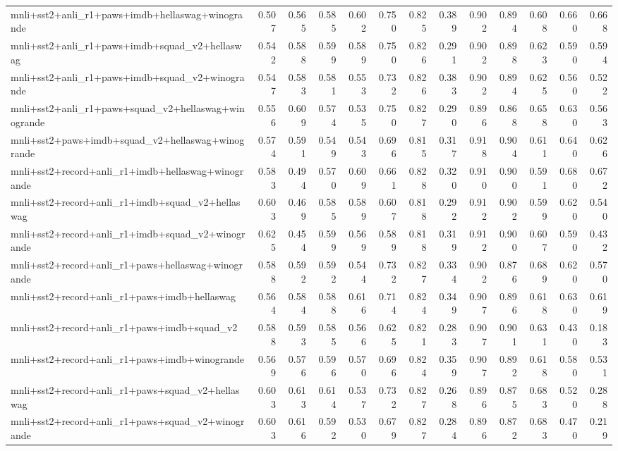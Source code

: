 \begin{table}[t]
\begin{tabular}{lrrrrrrrrrrrr}
    mnli+sst2+anli\_r1+paws+imdb+hellaswag+winogrande & 0.507 & 0.565 & 0.585 & 0.602 & 0.750 & 0.825 & 0.389 & 0.902 & 0.894 & 0.608 & 0.660 & 0.668 \\
    mnli+sst2+anli\_r1+paws+imdb+squad\_v2+hellaswag & 0.542 & 0.588 & 0.599 & 0.589 & 0.750 & 0.826 & 0.291 & 0.902 & 0.898 & 0.623 & 0.590 & 0.594 \\
    mnli+sst2+anli\_r1+paws+imdb+squad\_v2+winogrande & 0.547 & 0.583 & 0.581 & 0.553 & 0.732 & 0.826 & 0.383 & 0.902 & 0.894 & 0.625 & 0.560 & 0.522 \\
    mnli+sst2+anli\_r1+paws+squad\_v2+hellaswag+winogrande & 0.556 & 0.609 & 0.574 & 0.535 & 0.750 & 0.827 & 0.290 & 0.896 & 0.868 & 0.658 & 0.630 & 0.563 \\
    mnli+sst2+paws+imdb+squad\_v2+hellaswag+winogrande & 0.574 & 0.591 & 0.549 & 0.543 & 0.696 & 0.815 & 0.317 & 0.918 & 0.904 & 0.611 & 0.640 & 0.626 \\
    mnli+sst2+record+anli\_r1+imdb+hellaswag+winogrande & 0.583 & 0.494 & 0.570 & 0.609 & 0.661 & 0.828 & 0.320 & 0.910 & 0.900 & 0.591 & 0.680 & 0.672 \\
    mnli+sst2+record+anli\_r1+imdb+squad\_v2+hellaswag & 0.603 & 0.469 & 0.585 & 0.589 & 0.607 & 0.818 & 0.292 & 0.912 & 0.902 & 0.599 & 0.620 & 0.540 \\
    mnli+sst2+record+anli\_r1+imdb+squad\_v2+winogrande & 0.625 & 0.454 & 0.599 & 0.569 & 0.589 & 0.818 & 0.319 & 0.912 & 0.900 & 0.607 & 0.590 & 0.432 \\
    mnli+sst2+record+anli\_r1+paws+hellaswag+winogrande & 0.588 & 0.592 & 0.592 & 0.544 & 0.732 & 0.827 & 0.334 & 0.902 & 0.876 & 0.689 & 0.620 & 0.570 \\
    mnli+sst2+record+anli\_r1+paws+imdb+hellaswag & 0.564 & 0.584 & 0.588 & 0.616 & 0.714 & 0.824 & 0.349 & 0.907 & 0.896 & 0.618 & 0.630 & 0.619 \\
    mnli+sst2+record+anli\_r1+paws+imdb+squad\_v2 & 0.588 & 0.593 & 0.585 & 0.566 & 0.625 & 0.821 & 0.283 & 0.907 & 0.901 & 0.631 & 0.430 & 0.183 \\
    mnli+sst2+record+anli\_r1+paws+imdb+winogrande & 0.569 & 0.576 & 0.596 & 0.570 & 0.696 & 0.824 & 0.359 & 0.907 & 0.892 & 0.618 & 0.580 & 0.531 \\
    mnli+sst2+record+anli\_r1+paws+squad\_v2+hellaswag & 0.603 & 0.613 & 0.614 & 0.537 & 0.732 & 0.827 & 0.268 & 0.896 & 0.875 & 0.683 & 0.520 & 0.288 \\
    mnli+sst2+record+anli\_r1+paws+squad\_v2+winogrande & 0.603 & 0.616 & 0.592 & 0.530 & 0.679 & 0.827 & 0.284 & 0.896 & 0.872 & 0.683 & 0.470 & 0.219 \\

\end{tabular}
\end{table}
